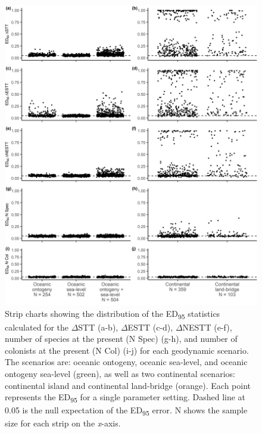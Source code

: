 \begin{figure}
    \centering
    \includegraphics[width=\textwidth]{facet_scenario_cs.png}
    \caption{Strip charts showing the distribution of the ED\textsubscript{95} statistics calculated for the $\Delta$STT (a-b), $\Delta$ESTT (c-d), $\Delta$NESTT (e-f), number of species at the present (N Spec) (g-h), and number of colonists at the present (N Col) (i-j) for each geodynamic scenario. The scenarios are: oceanic ontogeny, oceanic sea-level, and oceanic ontogeny sea-level (green), as well as two continental scenarios: continental island and continental land-bridge (orange). Each point represents the ED\textsubscript{95} for a single parameter setting. Dashed line at 0.05 is the null expectation of the ED\textsubscript{95} error. N shows the sample size for each strip on the \textit{x}-axis.}
    \label{fig:facet_scenario_cs}
\end{figure}

